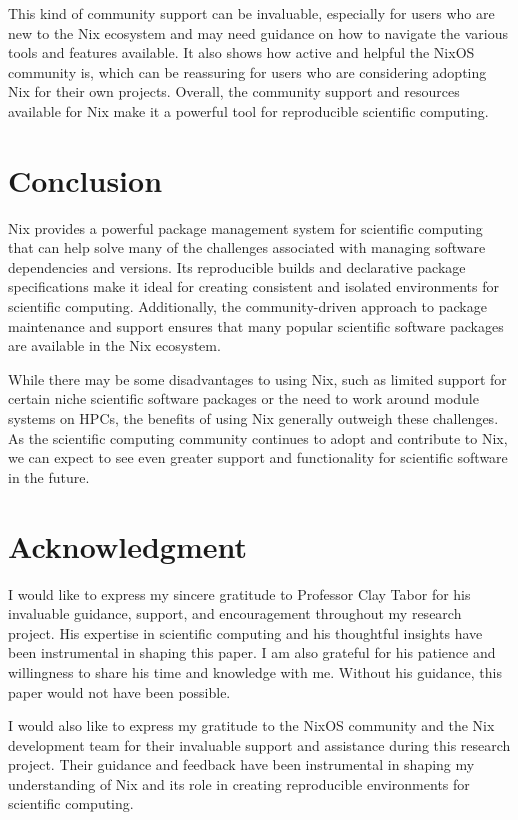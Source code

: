 \documentclass[
]{article}
\begin{document}
This kind of community support can be invaluable, especially for users who are new to the Nix ecosystem and may need guidance on how to navigate the various tools and features available. It also shows how active and helpful the NixOS community is, which can be reassuring for users who are considering adopting Nix for their own projects. Overall, the community support and resources available for Nix make it a powerful tool for reproducible scientific computing.

\hypertarget{conclusion}{%
\section{Conclusion}\label{conclusion}}

Nix provides a powerful package management system for scientific computing that can help solve many of the challenges associated with managing software dependencies and versions. Its reproducible builds and declarative package specifications make it ideal for creating consistent and isolated environments for scientific computing. Additionally, the community-driven approach to package maintenance and support ensures that many popular scientific software packages are available in the Nix ecosystem.

While there may be some disadvantages to using Nix, such as limited support for certain niche scientific software packages or the need to work around module systems on HPCs, the benefits of using Nix generally outweigh these challenges. As the scientific computing community continues to adopt and contribute to Nix, we can expect to see even greater support and functionality for scientific software in the future.

\hypertarget{acknowledgment}{%
\section{Acknowledgment}\label{acknowledgment}}

I would like to express my sincere gratitude to Professor Clay Tabor for his invaluable guidance, support, and encouragement throughout my research project. His expertise in scientific computing and his thoughtful insights have been instrumental in shaping this paper. I am also grateful for his patience and willingness to share his time and knowledge with me. Without his guidance, this paper would not have been possible.

I would also like to express my gratitude to the NixOS community and the Nix development team for their invaluable support and assistance during this research project. Their guidance and feedback have been instrumental in shaping my understanding of Nix and its role in creating reproducible environments for scientific computing.
\end{document}
